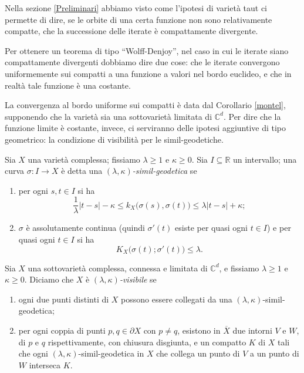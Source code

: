 Nella sezione \ref{Preliminari} abbiamo visto come l'ipotesi di varietà taut ci permette di dire, se le orbite di una certa funzione non sono relativamente compatte, che la successione delle iterate è compattamente divergente.

Per ottenere un teorema di tipo ``Wolff-Denjoy'', nel caso in cui le iterate siano compattamente divergenti dobbiamo dire due cose: che le iterate convergono uniformemente sui compatti a una funzione a valori nel bordo euclideo, e che in realtà tale funzione è una costante.

La convergenza al bordo uniforme sui compatti è data dal Corollario \ref{montel}, supponendo che la varietà sia una sottovarietà limitata di $\mathbb{C}^d$. Per dire che la funzione limite è costante, invece, ci serviranno delle ipotesi aggiuntive di tipo geometrico: la condizione di visibilità per le simil-geodetiche.

\begin{defn}
    Sia $X$ una varietà complessa; fissiamo $\lambda \ge 1$ e $\kappa \ge 0$. Sia $I\subseteq \mathbb{R}$ un intervallo; una curva $\sigma:I \longrightarrow X$ è detta una \textit{$(\lambda,\kappa)$-simil-geodetica} se
    \begin{enumerate}
        \item per ogni $s,t \in I$ si ha
        \begin{equation} \label{simil-geo1}
            \frac{1}{\lambda}|t-s|-\kappa \le k_X\big(\sigma(s),\sigma(t)\big)\le\lambda|t-s|+\kappa;
        \end{equation}
        \item $\sigma$ è assolutamente continua (quindi $\sigma'(t)$ esiste per quasi ogni $t \in I$) e per quasi ogni $t \in I$ si ha
        \begin{equation} \label{simil-geo2}
            K_X\big(\sigma(t);\sigma'(t)\big) \le \lambda.
        \end{equation}
    \end{enumerate}
\end{defn}

\begin{defn} \label{visibility}
    Sia $X$ una sottovarietà complessa, connessa e limitata di $\mathbb{C}^d$, e fissiamo $\lambda \ge 1$ e $\kappa \ge 0$. Diciamo che $X$ è \textit{$(\lambda,\kappa)$-visibile} se
    \begin{enumerate}
        \item ogni due punti distinti di $X$ possono essere collegati da una $(\lambda,\kappa)$-simil-geodetica;
        \item per ogni coppia di punti $p,q\in\partial X$ con $p\not=q$, esistono in $\overline{X}$ due intorni $V$ e $W$, di $p$ e $q$ rispettivamente, con chiusura disgiunta, e un compatto $K$ di $X$ tali che  ogni $(\lambda,\kappa)$-simil-geodetica in $X$ che collega un punto di $V$ a un punto di $W$ interseca $K$.
    \end{enumerate}
\end{defn}


